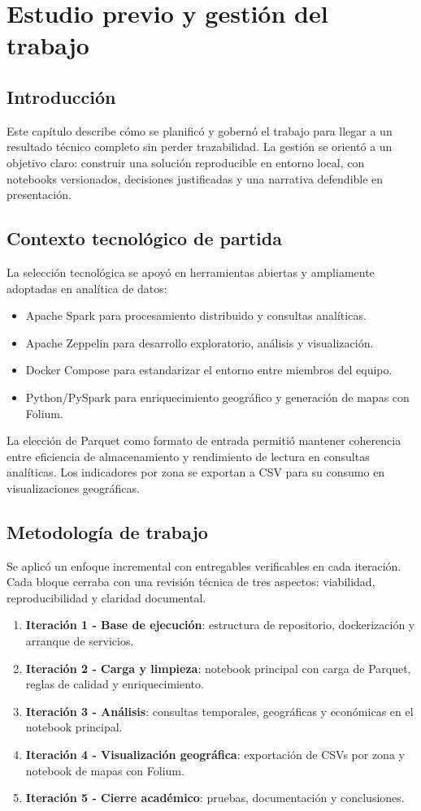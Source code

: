 \chapter{Estudio previo y gestión del trabajo}\label{cap:gestion}

\section{Introducción}
Este capítulo describe cómo se planificó y gobernó el trabajo para llegar a un
resultado técnico completo sin perder trazabilidad. La gestión se orientó a un
objetivo claro: construir una solución reproducible en entorno local, con notebooks
versionados, decisiones justificadas y una narrativa defendible en presentación.

\section{Contexto tecnológico de partida}
La selección tecnológica se apoyó en herramientas abiertas y ampliamente adoptadas
en analítica de datos:
\begin{itemize}
	\item Apache Spark para procesamiento distribuido y consultas analíticas.
	\item Apache Zeppelin para desarrollo exploratorio, análisis y visualización.
	\item Docker Compose para estandarizar el entorno entre miembros del equipo.
	\item Python/PySpark para enriquecimiento geográfico y generación de mapas
	con Folium.
\end{itemize}

La elección de Parquet como formato de entrada permitió mantener coherencia entre
eficiencia de almacenamiento y rendimiento de lectura en consultas analíticas.
Los indicadores por zona se exportan a CSV para su consumo en visualizaciones
geográficas.

\section{Metodología de trabajo}
Se aplicó un enfoque incremental con entregables verificables en cada iteración.
Cada bloque cerraba con una revisión técnica de tres aspectos: viabilidad,
reproducibilidad y claridad documental.

\begin{enumerate}
	\item \textbf{Iteración 1 - Base de ejecución}: estructura de repositorio,
	dockerización y arranque de servicios.
	\item \textbf{Iteración 2 - Carga y limpieza}: notebook principal con carga
	de Parquet, reglas de calidad y enriquecimiento.
	\item \textbf{Iteración 3 - Análisis}: consultas temporales, geográficas y
	económicas en el notebook principal.
	\item \textbf{Iteración 4 - Visualización geográfica}: exportación de CSVs
	por zona y notebook de mapas con Folium.
	\item \textbf{Iteración 5 - Cierre académico}: pruebas, documentación y
	conclusiones.
\end{enumerate}

